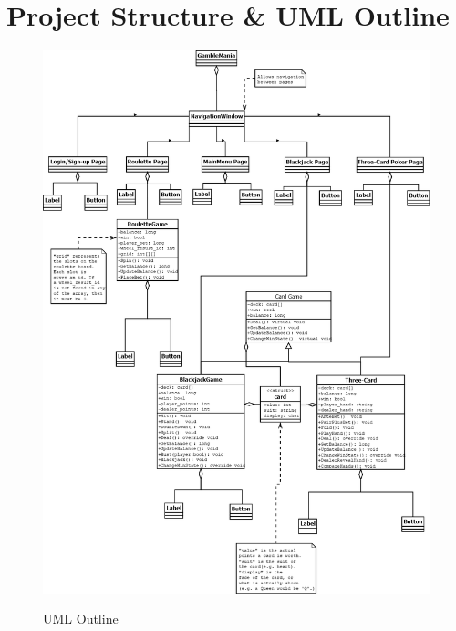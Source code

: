 \documentclass[10pt,conference,onecolumn,compsoc]{IEEEtran}
\begin{document}
\section{Project Structure \& UML Outline}

\begin{figure}[h]
\caption{UML Outline}
\includegraphics[scale=0.4]{GameDesign}
\label{fig:outline}
\centering
\end{figure}
\end{document}

